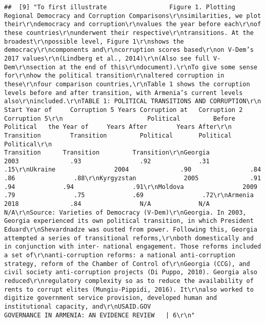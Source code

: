 \documentclass[
]{article}
\begin{document}
\begin{verbatim}
##  [9] "To first illustrate                 Figure 1. Plotting Regional Democracy and Corruption Comparisons\r\nsimilarities, we plot their\r\ndemocracy and corruption\r\nvalues the year before each\r\nof these countries\r\nunderwent their respective\r\ntransitions. At the broadest\r\npossible level, Figure 1\r\nshows the democracy\r\ncomponents and\r\ncorruption scores based\r\non V-Dem’s 2017 values\r\n(Lindberg et al., 2014)\r\n(Also see full V-Dem\r\nsection at the end of this\r\ndocument).\r\nTo give some sense for\r\nhow the political transition\r\naltered corruption in these\r\nfour comparison countries,\r\nTable 1 shows the corruption levels before and after transition, with Armenia’s current levels also\r\nincluded.\r\nTABLE 1: POLITICAL TRANSITIONS AND CORRUPTION\r\n                       Start Year of     Corruption 5 Years Corruption at   Corruption 2       Corruption 5\r\n                       Political         Before Political   the Year of     Years After        Years After\r\n                       Transition        Transition         Political       Political          Political\r\n                                                            Transition      Transition         Transition\r\nGeorgia                2003              .93                .92             .31                .15\r\nUkraine                2004              .90                .84             .86                .88\r\nKyrgyzstan             2005              .91                .94             .94                .91\r\nMoldova                2009              .79                .75             .69                .72\r\nArmenia                2018              .84                N/A             N/A                N/A\r\nSource: Varieties of Democracy (V-Dem)\r\nGeorgia. In 2003, Georgia experienced its own political transition, in which President Eduard\r\nShevardnadze was ousted from power. Following this, Georgia attempted a series of transitional reforms,\r\nboth domestically and in conjunction with inter- national engagement. Those reforms included a set of\r\nanti-corruption reforms: a national anti-corruption strategy, reform of the Chamber of Control of\r\nGeorgia (CCG), and civil society anti-corruption projects (Di Puppo, 2010). Georgia also reduced\r\nregulatory complexity so as to reduce the availability of rents to corrupt elites (Mungiu-Pippidi, 2016). It\r\nalso worked to digitize government service provision, developed human and institutional capacity, and\r\nUSAID.GOV                                                       GOVERNANCE IN ARMENIA: AN EVIDENCE REVIEW   | 6\r\n"                                                                                                                                                                                                                                                                                                                                                                                                                                                                                                                                                                                                                                                                                                                          
\end{verbatim}
\end{document}
